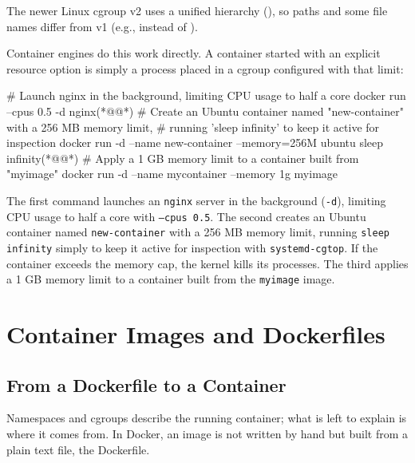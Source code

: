 \begin{warningblock}[cgroup v2]
    The newer Linux cgroup v2 uses a unified hierarchy (), so paths and some file names differ from v1 (e.g.,  instead of ).
\end{warningblock}

Container engines do this work directly. A container started with an explicit resource option is simply a process placed in a cgroup configured with that limit:

    \begin{codeblock}[language=bash, escapeinside={(*@}{@*)}]
# Launch nginx in the background, limiting CPU usage to half a core
docker run --cpus 0.5 -d nginx(*@\vspace{1em}@*)
# Create an Ubuntu container named "new-container" with a 256 MB memory limit,
# running 'sleep infinity' to keep it active for inspection
docker run -d --name new-container --memory=256M ubuntu sleep infinity(*@\vspace{1em}@*)
# Apply a 1 GB memory limit to a container built from "myimage"
docker run -d --name mycontainer --memory 1g myimage
    \end{codeblock}

The first command launches an \texttt{nginx} server in the background (\texttt{-d}), limiting CPU usage to half a core with \texttt{--cpus 0.5}. The second creates an Ubuntu container named \texttt{new-container} with a 256 MB memory limit, running \texttt{sleep infinity} simply to keep it active for inspection with \texttt{systemd-cgtop}. If the container exceeds the memory cap, the kernel kills its processes. The third applies a 1 GB memory limit to a container built from the \texttt{myimage} image.

\section{Container Images and Dockerfiles} \label{sec:images_dockerfiles}

\subsection{From a Dockerfile to a Container}

Namespaces and cgroups describe the running container; what is left to explain is where it comes from. In Docker, an image is not written by hand but built from a plain text file, the Dockerfile.

